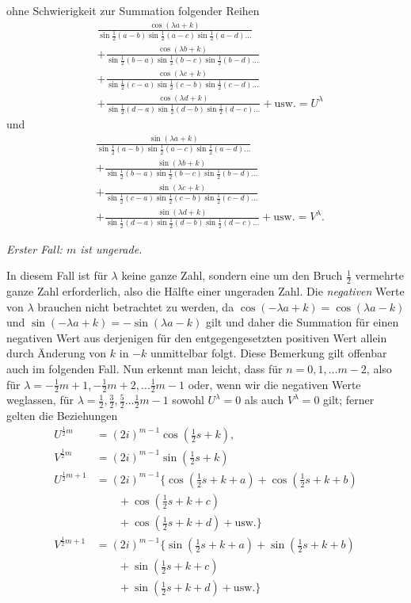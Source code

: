 ohne Schwierigkeit zur Summation folgender Reihen
\[
\begin{aligned}
&\frac{\cos(\lambda a+k)}{\sin\tfrac12(a-b)\sin\tfrac12(a-c)\sin\tfrac12(a-d)\ldots}\\
&+\frac{\cos(\lambda b+k)}{\sin\tfrac12(b-a)\sin\tfrac12(b-c)\sin\tfrac12(b-d)\ldots}\\
&+\frac{\cos(\lambda c+k)}{\sin\tfrac12(c-a)\sin\tfrac12(c-b)\sin\tfrac12(c-d)\ldots}\\
&+\frac{\cos(\lambda d+k)}{\sin\tfrac12(d-a)\sin\tfrac12(d-b)\sin\tfrac12(d-c)\ldots}+\text{usw.}=U^\lambda
\end{aligned}
\]
und
\[
\begin{aligned}
&\frac{\sin(\lambda a+k)}{\sin\tfrac12(a-b)\sin\tfrac12(a-c)\sin\tfrac12(a-d)\ldots}\\
&+\frac{\sin(\lambda b+k)}{\sin\tfrac12(b-a)\sin\tfrac12(b-c)\sin\tfrac12(b-d)\ldots}\\
&+\frac{\sin(\lambda c+k)}{\sin\tfrac12(c-a)\sin\tfrac12(c-b)\sin\tfrac12(c-d)\ldots}\\
&+\frac{\sin(\lambda d+k)}{\sin\tfrac12(d-a)\sin\tfrac12(d-b)\sin\tfrac12(d-c)\ldots}+\text{usw.}=V^\lambda.
\end{aligned}
\]
\begin{center}\textit{Erster Fall: $m$ ist ungerade.}\end{center}
In diesem Fall ist für $\lambda$ keine ganze Zahl, sondern eine um den Bruch $\frac12$ vermehrte ganze Zahl erforderlich, also die Hälfte einer ungeraden Zahl. Die \textit{negativen} Werte von $\lambda$ brauchen nicht betrachtet zu werden, da $\cos(-\lambda a+k)=\cos(\lambda a-k)$ und $\sin(-\lambda a+k)=-\sin(\lambda a-k)$ gilt und daher die Summation für einen negativen Wert aus derjenigen für den entgegengesetzten positiven Wert allein durch Änderung von $k$ in $-k$ unmittelbar folgt. Diese Bemerkung gilt offenbar auch im folgenden Fall. Nun erkennt man leicht, dass für $n=0,1,\ldots m-2$, also für $\lambda=-\frac12m+1,-\frac12m+2,\ldots\frac12m-1$ oder, wenn wir die negativen Werte weglassen, für $\lambda=\frac12,\frac32,\frac52\ldots\frac12m-1$ sowohl $U^\lambda=0$ als auch $V^\lambda=0$ gilt; ferner gelten die Beziehungen
\[
\begin{aligned}
U^{\frac12m}&=(2i)^{m-1}\cos(\tfrac12s+k),\\V^{\frac12m}&=(2i)^{m-1}\sin(\tfrac12s+k)\\
U^{\frac12m+1}&=(2i)^{m-1}\{\cos(\tfrac12s+k+a)+\cos(\tfrac12s+k+b)\\&\qquad+\cos(\tfrac12s+k+c)\\
&\qquad+\cos(\tfrac12s+k+d)+\text{usw.}\}\\
V^{\frac12m+1}&=(2i)^{m-1}\{\sin(\tfrac12s+k+a)+\sin(\tfrac12s+k+b)\\&\qquad+\sin(\tfrac12s+k+c)\\
&\qquad+\sin(\tfrac12s+k+d)+\text{usw.}\}
\end{aligned}
\]
